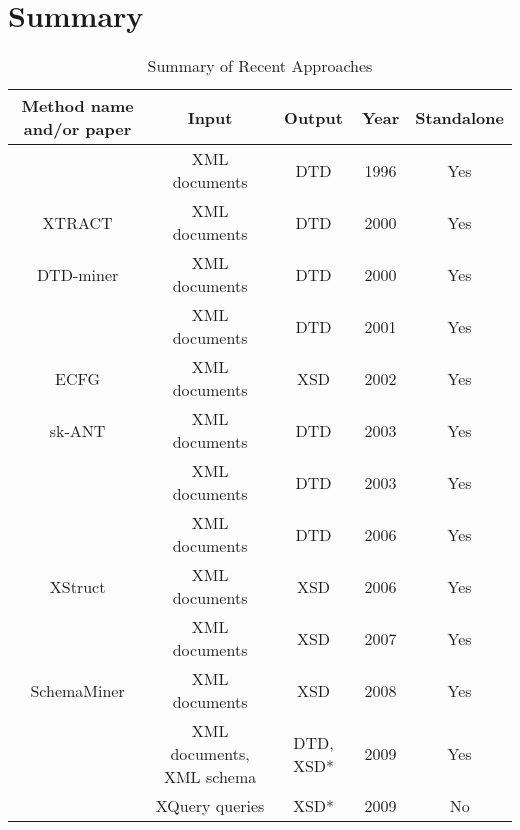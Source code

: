 \section{Summary}
\begin{table}
  \footnotesize \begin{tabular}{|c|c|c|c|c|}
    \hline
    Method name and/or paper & Input & Output & Year & Standalone \\ \hline \hline
    \cite{Ahonen1996GeneratingGrammars} & XML documents & DTD & 1996 & Yes \\ \hline
    XTRACT \cite{Garofalakis:2000:XSE:342009.335409} & XML documents & DTD & 2000 & Yes \\ \hline
    DTD-miner \cite{Moh:2000:RSW:336597.336638} & XML documents & DTD & 2000 & Yes \\ \hline
    \cite{Fernau:2001:LXG:645744.667236} & XML documents & DTD & 2001 & Yes \\ \hline
    ECFG \cite{Chidlovskii:2002:SEX:544220.544288} & XML documents & XSD & 2002 & Yes \\ \hline
    sk-ANT \cite{Wong03onstructural} & XML documents & DTD & 2003 & Yes \\ \hline
    \cite {Min:2003:EES:639473.639475} & XML documents & DTD & 2003 & Yes \\ \hline
    \cite{Bex:2006:ICD:1182635.1164139} & XML documents & DTD & 2006 & Yes \\ \hline
    XStruct \cite {Hegewald:2006:XES:1129755.1130124} & XML documents & XSD & 2006 & Yes \\ \hline
    \cite{Bex:2007:IXS:1325851.1325964} & XML documents & XSD & 2007 & Yes \\ \hline
    SchemaMiner \cite{Vosta:2008:EAC:1802514.1802522} & XML documents & XSD & 2008 & Yes \\ \hline
    \cite{Mlynkova:2009:IXS:1862681.1862693} & XML documents, XML schema & DTD, XSD* & 2009 & Yes \\ \hline
    \cite{Necasky:2009:DXK:1529282.1529414} & XQuery queries & XSD* & 2009 & No \\ \hline    
  \end{tabular}
  \caption{Summary of Recent Approaches}
  \label{table_summary_of_recent_approaches}
\end{table}